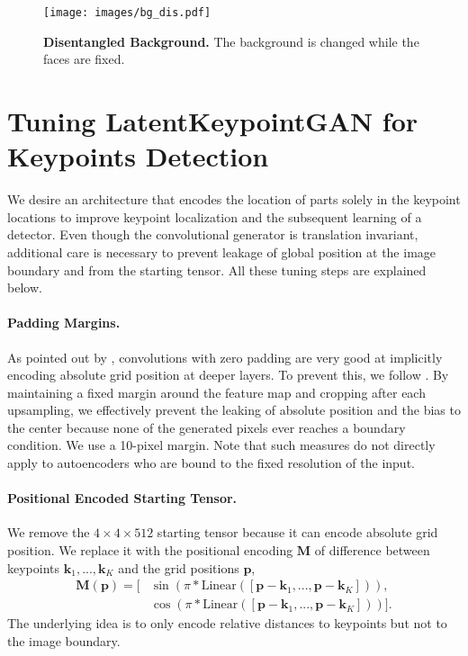 \documentclass[10pt, conference, compsocconf]{IEEEtran}
\newcommand{\vk}{\mathbf{k}}
\newcommand{\vp}{\mathbf{p}}
\newcommand{\mM}{\mathbf{M}}
\begin{document}
\begin{figure}
 \vspace{1pt}
\texttt{[image: images/bg\_dis.pdf]}
  \caption{\textbf{Disentangled Background.} The background is changed while the faces are fixed.}
\label{fig:bg_dis}
\end{figure} \section{Tuning LatentKeypointGAN for Keypoints Detection}  \label{sec:supp_detection}

We desire an architecture that encodes the location of parts solely in the keypoint locations to improve keypoint localization and the subsequent learning of a detector. Even though the convolutional generator is translation invariant, additional care is necessary to prevent leakage of global position at the image boundary and from the starting tensor. All these tuning steps are explained below.

\paragraph{Padding Margins.} As pointed out by \cite{islam2020much, alsallakh2021mind, xu2020positional, kayhan2020translation}, convolutions with zero padding are very good at implicitly encoding absolute grid position at deeper layers. To prevent this, we follow \cite{karras2021alias}. By maintaining a fixed margin around the feature map and cropping after each upsampling, we effectively prevent the leaking of absolute position and the bias to the center because none of the generated pixels ever reaches a boundary condition. We use a 10-pixel margin. Note that such measures do not directly apply to autoencoders who are bound to the fixed resolution of the input.

\paragraph{Positional Encoded Starting Tensor.} We remove the $4\times4\times512$ starting tensor because it can encode absolute grid position. We replace it with the positional encoding $\mM$ of difference between keypoints $\vk_1,...,\vk_K$ and the grid positions $\vp$, 
\begin{equation}
    \begin{aligned}
        \mM(\vp) = [&\sin(\pi*\text{Linear}([\vp-\vk_1, ..., \vp-\vk_K])), \\
        &\cos(\pi*\text{Linear}([\vp-\vk_1, ..., \vp-\vk_K]))].
    \end{aligned}
\end{equation}
The underlying idea is to only encode relative distances to keypoints but not to the image boundary.
\end{document}

